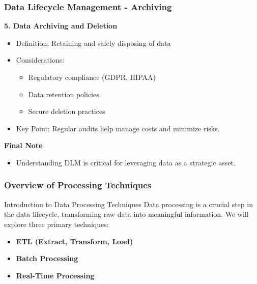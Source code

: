 \documentclass[aspectratio=169]{beamer}
\begin{document}
\begin{frame}[fragile]
    \frametitle{Data Lifecycle Management - Archiving}
    \textbf{5. Data Archiving and Deletion}
    \begin{itemize}
        \item Definition: Retaining and safely disposing of data
        \item Considerations:
            \begin{itemize}
                \item Regulatory compliance (GDPR, HIPAA)
                \item Data retention policies
                \item Secure deletion practices
            \end{itemize}
        \item Key Point: Regular audits help manage costs and minimize risks.
    \end{itemize}

    \textbf{Final Note}
    \begin{itemize}
        \item Understanding DLM is critical for leveraging data as a strategic asset. 
    \end{itemize}
\end{frame}

\begin{frame}[fragile]
    \frametitle{Overview of Processing Techniques}
    \begin{block}{Introduction to Data Processing Techniques}
        Data processing is a crucial step in the data lifecycle, transforming raw data into meaningful information. 
        We will explore three primary techniques:
        \begin{itemize}
            \item \textbf{ETL (Extract, Transform, Load)}
            \item \textbf{Batch Processing}
            \item \textbf{Real-Time Processing}
        \end{itemize}
    \end{block}
\end{frame}
\end{document}
